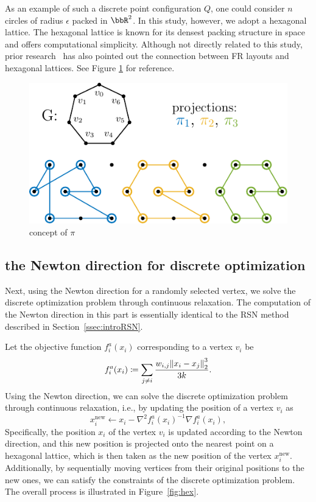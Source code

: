 \documentclass[dvipdfmx,lettersize,journal]{IEEEtran}
\newcommand{\defeq}{\coloneqq}
\begin{document}
As an example of such a discrete point configuration $Q$, one could consider $n$ circles of radius $\epsilon$ packed in $\bbR^2$.
In this study, however, we adopt a hexagonal lattice.
The hexagonal lattice is known for its densest packing structure in space and offers computational simplicity.
Although not directly related to this study, prior research~\cite{s22145179} has also pointed out the connection between FR layouts and hexagonal lattices.
See Figure \ref{fig:pi} for reference.

\begin{figure}[t]
  \centering
  \includegraphics[width=\columnwidth]{pi/pi.pdf}
  \caption{concept of $\pi$}
  \label{fig:pi}
\end{figure}

\subsection{the Newton direction for discrete optimization}\label{ssec:newtonDirection}

Next, using the Newton direction for a randomly selected vertex, we solve the discrete optimization problem through continuous relaxation. The computation of the Newton direction in this part is essentially identical to the RSN method described in Section~\ref{ssec:introRSN}.

Let the objective function $f^a_i(x_i)$ corresponding to a vertex $v_i$ be
\begin{equation*}
  f^a_i(x_i) \defeq \sum_{j \neq i} \frac{w_{i,j}\norm{x_i - x_j}_2^3}{3k}.
\end{equation*}
Using the Newton direction, we can solve the discrete optimization problem through continuous relaxation, i.e., by updating the position of a vertex $v_i$ as
\begin{equation*}
  x_i^\mathrm{new} \gets x_i - \nabla^2 f^a_i(x_i)^{-1} \nabla f^a_i(x_i),
\end{equation*}
Specifically, the position $x_i$ of the vertex $v_i$ is updated according to the Newton direction, and this new position is projected onto the nearest point on a hexagonal lattice, which is then taken as the new position of the vertex $x_i^\mathrm{new}$.
Additionally, by sequentially moving vertices from their original positions to the new ones, we can satisfy the constraints of the discrete optimization problem. The overall process is illustrated in Figure~\ref{fig:hex}.
\end{document}
